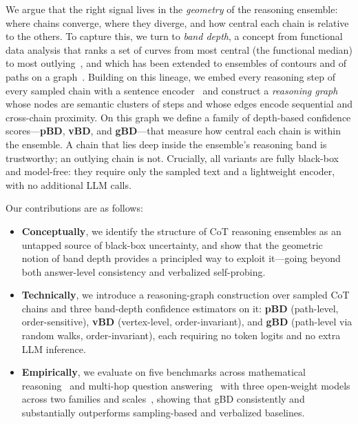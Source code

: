 \documentclass[twoside]{article}
\begin{document}
We argue that the right signal lives in the \emph{geometry} of the reasoning
ensemble: where chains converge, where they diverge, and how central each chain
is relative to the others. To capture this, we turn to \emph{band depth}, a
concept from functional data analysis that ranks a set of curves from most
central (the functional median) to most outlying~\citep{lopezpintado2009banddepth},
and which has been extended to ensembles of contours and of paths on a
graph~\citep{santer2023contourbanddepth, raj2017pathboxplots}. Building on this
lineage, we embed every reasoning step of every sampled chain with a sentence
encoder~\citep{reimers2019sentencebert} and construct a \emph{reasoning graph}
whose nodes are semantic clusters of steps and whose edges encode sequential and
cross-chain proximity. On this graph we define a family of depth-based
confidence scores---\textbf{pBD}, \textbf{vBD}, and \textbf{gBD}---that measure
how central each chain is within the ensemble. A chain that lies deep inside the
ensemble's reasoning band is trustworthy; an outlying chain is not. Crucially,
all variants are fully black-box and model-free: they require only the sampled
text and a lightweight encoder, with no additional LLM calls.

Our contributions are as follows:
\begin{itemize}
  \item \textbf{Conceptually}, we identify the structure of CoT reasoning
        ensembles as an untapped source of black-box uncertainty, and show that
        the geometric notion of band depth provides a principled way to exploit
        it---going beyond both answer-level consistency and verbalized
        self-probing.
  \item \textbf{Technically}, we introduce a reasoning-graph construction over
        sampled CoT chains and three band-depth confidence estimators on it:
        \textbf{pBD} (path-level, order-sensitive), \textbf{vBD} (vertex-level,
        order-invariant), and \textbf{gBD} (path-level via random walks,
        order-invariant), each requiring no token logits and no extra LLM
        inference.
  \item \textbf{Empirically}, we evaluate on five benchmarks across mathematical
        reasoning~\citep{cobbe2021gsm8k, patel2021svamp, miao2020asdiv} and
        multi-hop question answering~\citep{yang2018hotpotqa, ho2020wikimultihop}
        with three open-weight models across two families and
        scales~\citep{touvron2023llama2, grattafiori2024llama3, qwen2024qwen25},
        showing that gBD consistently and substantially outperforms
        sampling-based and verbalized baselines.
\end{itemize}
\end{document}
